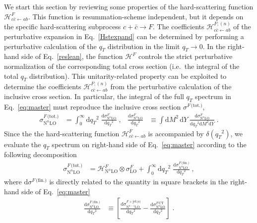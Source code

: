 \documentclass[12pt]{article}
\DeclareRobustCommand{\qt}{\ensuremath{q_T}\xspace}
\DeclareRobustCommand{\rd}{\ensuremath{\mathrm{d}}}
\DeclareRobustCommand{\cH}{\ensuremath{\mathcal{H}}}
\DeclareRobustCommand{\jets}{\text{jet(s)}\xspace}
\DeclareRobustCommand{\CT}{\text{CT}\xspace}
\DeclareRobustCommand{\fin}{\text{(fin.)}\xspace}
\DeclareRobustCommand{\tot}{\text{(tot.)}\xspace}
\DeclareRobustCommand{\LO}{\text{LO}\xspace}
\DeclareRobustCommand{\N}[1]{\ensuremath{\text{N}^{#1}}} %
\begin{document}
We start this section by reviewing some properties of the hard-scattering function $\cH_{c{\bar c} \gets ab}^{F}$. 
This function is resummation-scheme independent, but it depends on the specific hard-scattering subprocess $c + {\bar c} \to F$. 
The coefficients $\cH_{c{\bar c} \gets ab}^{F;(n)}$ of the perturbative expansion in Eq.~\eqref{Hstexpand} can be determined by performing a perturbative calculation of the $\qt$ distribution in the limit $\qt \to 0$. 
In the right-hand side of Eq.~\eqref{reslean}, the function $\cH^{F}$ controls the strict perturbative normalization of the corresponding total cross section (i.e.\ the integral of the total $\qt$ distribution). 
This unitarity-related property can be exploited to determine the coefficients $\cH_{c{\bar c} \gets ab}^{F ;(n)}$ from the perturbative calculation of the inclusive cross section.  
In particular, the integral of the full $\qt$ spectrum in Eq.~\eqref{eq:master} must reproduce the inclusive cross section $\sigma^{F\,\tot}$,
\begin{align}
  \sigma^{F\,\tot}_{\N{n}\LO}
  &=
  \int_0^\infty\rd\qt^2 \; \frac{\rd\sigma^{F}_{\N{n}\LO}}{\rd\qt^2} \;, 
  &
  \frac{\rd\sigma^{F}_{\N{n}\LO}}{\rd\qt^2}
  &\equiv
  \int\rd M^2 \, \rd Y \;
  \frac{\rd\sigma^{F}_{\N{n}\LO}}{\rd\qt^2\rd M^2\rd Y} \;.
  \label{restotp}
\end{align}
Since the the hard-scattering function $\cH_{c\bar{c}\gets ab}^{F}$ is accompanied by $\delta(\qt^{2})$, we evaluate the $\qt$ spectrum on right-hand side of Eq.~\eqref{eq:master} according to the following decomposition
\begin{align}
  \sigma^{F\,\tot}_{\N{n}\LO}
  &=
  \cH^F_{\N{n}\LO} \otimes \sigma^F_{\LO} + 
  \int_0^\infty\rd\qt^2 \; \frac{\rd\sigma^{F\,\fin}_{\N{n}\LO}}{\rd\qt^2} \;, 
  \label{sigtotrel} 
\end{align}
where $\rd{\sigma}^{F\,\fin}$ is directly related to the quantity in square brackets in the right-hand side of Eq.~\eqref{eq:master}
\begin{align}
  \frac{\rd\sigma^{F\,\fin}_{\N{n}\LO}}{\rd\qt^2}
  &\equiv
  \left[
    \frac{\rd\sigma^{F+\jets}_{\N{n-1}\LO}}{\rd\qt^2} -
    \frac{\rd\sigma^{F\,\CT}_{\N{n}\LO}}{\rd\qt^2} 
  \right]
  \; .
  \label{sigfin}
\end{align}
\end{document}
